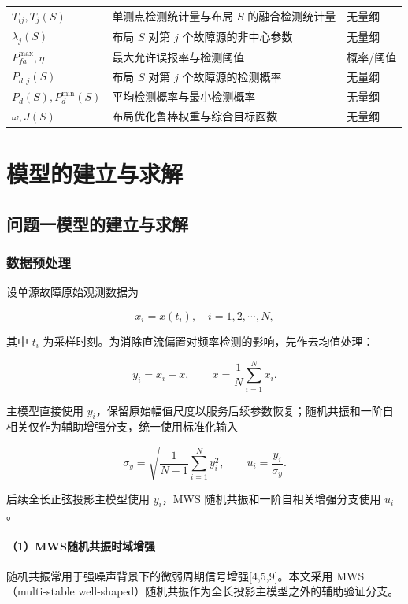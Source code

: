 \documentclass[UTF8,a4paper,12pt]{ctexart}
\numberwithin{figure}{section}
\numberwithin{table}{section}
\begin{document}
\begin{longtable}{>{\centering\arraybackslash}p{3.1cm}p{7.8cm}>{\centering\arraybackslash}p{2.8cm}}
$T_{ij},T_j(S)$ & 单测点检测统计量与布局 \(S\) 的融合检测统计量 & 无量纲\\
$\lambda_j(S)$ & 布局 \(S\) 对第 \(j\) 个故障源的非中心参数 & 无量纲\\
$P_{fa}^{\max},\eta$ & 最大允许误报率与检测阈值 & 概率/阈值\\
$P_{d,j}(S)$ & 布局 \(S\) 对第 \(j\) 个故障源的检测概率 & 无量纲\\
$\overline{P_d}(S),P_d^{\min}(S)$ & 平均检测概率与最小检测概率 & 无量纲\\
$\omega,J(S)$ & 布局优化鲁棒权重与综合目标函数 & 无量纲\\
\bottomrule
\end{longtable}

\section{模型的建立与求解}

\subsection{问题一模型的建立与求解}


\subsubsection{数据预处理}


设单源故障原始观测数据为


\[
x_i=x(t_i),\quad i=1,2,\cdots,N,
\]


其中 \(t_i\) 为采样时刻。为消除直流偏置对频率检测的影响，先作去均值处理：


\[
y_i=x_i-\bar{x},\qquad 
\bar{x}=\frac{1}{N}\sum_{i=1}^{N}x_i.
\]


主模型直接使用 \(y_i\)，保留原始幅值尺度以服务后续参数恢复；随机共振和一阶自相关仅作为辅助增强分支，统一使用标准化输入


\[
\sigma_y=\sqrt{\frac{1}{N-1}\sum_{i=1}^{N}y_i^2},
\qquad
u_i=\frac{y_i}{\sigma_y}.
\]


后续全长正弦投影主模型使用 \(y_i\)，MWS 随机共振和一阶自相关增强分支使用 \(u_i\)。


\paragraph{（1）MWS随机共振时域增强}


随机共振常用于强噪声背景下的微弱周期信号增强[4,5,9]。本文采用 MWS（multi-stable well-shaped）随机共振作为全长投影主模型之外的辅助验证分支。
\end{document}
